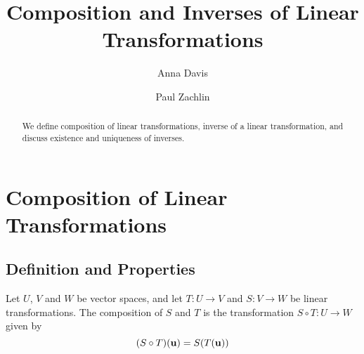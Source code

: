 \documentclass{ximera}
\author{Anna Davis \and Paul Zachlin} \title{Composition and Inverses of Linear Transformations} \license{CC-BY 4.0}
\renewcommand{\vec}[1]{{\bf #1}}
\newcommand{\RR}{\mathbb{R}}
\begin{document}
\begin{abstract}
  We define composition of linear transformations, inverse of a linear transformation, and discuss existence and uniqueness of inverses.
\end{abstract}
\maketitle





\section*{Composition of Linear Transformations}

\subsection*{Definition and Properties}
\begin{definition} Let $U$, $V$ and $W$ be vector spaces, and let $T:U\rightarrow V$ and $S:V\rightarrow W$ be linear transformations.  The composition of $S$ and $T$ is the transformation $S\circ T:U\rightarrow W$ given by
$$(S\circ T)(\vec{u})=S(T(\vec{u}))$$
\end{definition}
\end{document}
